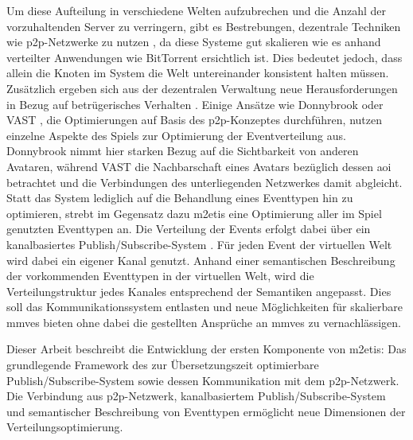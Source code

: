 Um diese Aufteilung in verschiedene Welten aufzubrechen und die Anzahl der vorzuhaltenden Server zu verringern, gibt es Bestrebungen, dezentrale Techniken wie \ac{p2p}-Netzwerke zu nutzen \cite{Knutsson2004Peertopeer, Triebel2008Peertopeer}, da diese Systeme gut skalieren wie es anhand verteilter Anwendungen wie BitTorrent ersichtlich ist. Dies bedeutet jedoch, dass allein die Knoten im System die Welt untereinander konsistent halten müssen. Zusätzlich ergeben sich aus der dezentralen Verwaltung neue Herausforderungen in Bezug auf betrügerisches Verhalten \cite{Kabus2007Design}. Einige Ansätze wie Donnybrook \cite{Bharambe2008Donnybrook} oder VAST \cite{Backhaus2007Voronoibased}, die Optimierungen auf Basis des \ac{p2p}-Konzeptes durchführen, nutzen einzelne Aspekte des Spiels zur Optimierung der Eventverteilung aus. Donnybrook nimmt hier starken Bezug auf die Sichtbarkeit von anderen Avataren, während VAST die Nachbarschaft eines Avatars bezüglich dessen \ac{aoi} betrachtet und die Verbindungen des unterliegenden Netzwerkes damit abgleicht. Statt das System lediglich auf die Behandlung eines Eventtypen hin zu optimieren, strebt im Gegensatz dazu \ac{m2etis} eine Optimierung aller im Spiel genutzten Eventtypen an. Die Verteilung der Events erfolgt dabei über ein kanalbasiertes Publish/Subscribe-System \cite{Fischer2010a}. Für jeden Event der virtuellen Welt wird dabei ein eigener Kanal genutzt. Anhand einer semantischen Beschreibung der vorkommenden Eventtypen in der virtuellen Welt, wird die Verteilungstruktur jedes Kanales entsprechend der Semantiken angepasst. Dies soll das Kommunikationssystem entlasten und neue Möglichkeiten für skalierbare \acp{mmve} bieten ohne dabei die gestellten Ansprüche an \acp{mmve} zu vernachlässigen.

Dieser Arbeit beschreibt die Entwicklung der ersten Komponente von \ac{m2etis}: Das grundlegende Framework des zur Übersetzungszeit optimierbare Publish/Subscribe-System sowie dessen Kommunikation mit dem \ac{p2p}-Netzwerk. Die Verbindung aus \ac{p2p}-Netzwerk, kanalbasiertem Publish/Subscribe-System und semantischer Beschreibung von Eventtypen ermöglicht neue Dimensionen der Verteilungsoptimierung.

